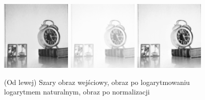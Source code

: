 \documentclass[final,a4paper,openany,12pt]{mwbk}
\begin{document}
\begin{figure}[H]
	\begin{center}
		\includegraphics[width=0.3\textwidth]{1/1Gray_Log_Original}
		\includegraphics[width=0.3\textwidth]{1/1Gray_Log_Result}
		\includegraphics[width=0.3\textwidth]{1/1Gray_Log_Result_Norm}
	\end{center}
	\caption{(Od lewej) Szary obraz wejściowy, obraz po logarytmowaniu logarytmem naturalnym, obraz po normalizacji }
\end{figure}
\end{document}
